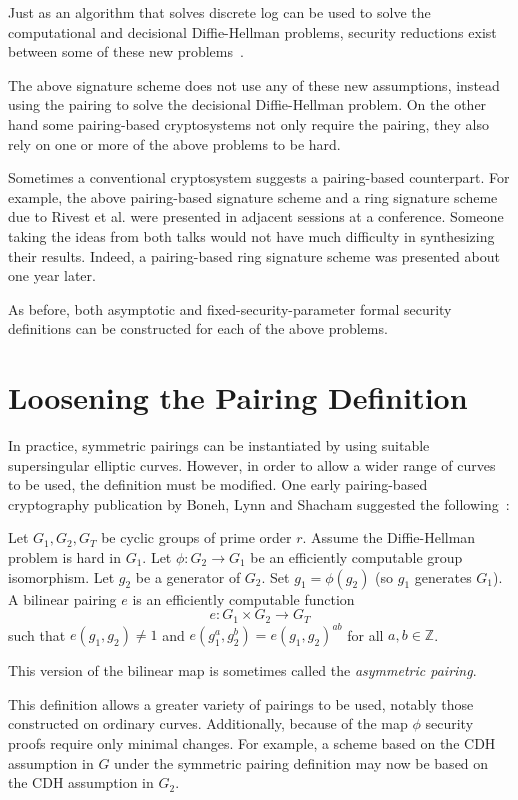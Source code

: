 Just as an algorithm that solves discrete log can be used to solve
the computational and decisional Diffie-Hellman problems, security reductions
exist between some of these new problems~\cite{jouxsurvey}.

The above signature scheme does not use any of these new assumptions,
instead using the pairing to solve the decisional Diffie-Hellman problem.
On the other hand some pairing-based cryptosystems not only require the
pairing, they also rely on one or more of the above problems to be hard.

Sometimes a conventional cryptosystem suggests
a pairing-based counterpart. For example,
the above pairing-based signature scheme and a ring signature scheme
due to Rivest et al. \cite{rst} were presented in adjacent sessions
at a conference. Someone taking the ideas from both talks would not have much
difficulty in synthesizing their results. Indeed,
a pairing-based ring signature scheme was presented about one
year later\cite{bgls}.

As before, both asymptotic and fixed-security-parameter formal security
definitions can be constructed for each of the above problems.

\section{\label{sec:asymmetricpairing}Loosening the Pairing Definition}

In practice, symmetric pairings can be instantiated by
using suitable supersingular elliptic curves.
However, in order to allow a wider range of curves to be used,
the definition must be modified. One early pairing-based cryptography
publication by Boneh, Lynn and Shacham
suggested the following~\cite{bls}:

Let $G_1, G_2, G_T$ be cyclic groups of prime order $r$.
Assume the Diffie-Hellman problem is hard in $G_1$.
Let $\phi : G_2 \rightarrow G_1$ be an efficiently computable group
isomorphism. Let $g_2$ be a generator of $G_2$.
Set $g_1 = \phi(g_2)$ (so $g_1$ generates $G_1$). 
A bilinear pairing $e$ is an efficiently computable function
\[
e:G_1 \times G_2 \rightarrow G_T
\]
such that $e(g_1,g_2) \ne 1$ and
$e(g_1^a, g_2^b) = e(g_1,g_2)^{a b}$ for all $a, b \in \mathbb{Z}$.

This version of the bilinear map is sometimes called
the \emph{asymmetric pairing}.

This definition allows a greater variety of pairings to be used,
notably those constructed on ordinary curves.
Additionally, because of the map $\phi$ security proofs
require only minimal changes. For example,
a scheme based on the CDH assumption in $G$ under
the symmetric pairing definition may now be based on the CDH assumption in
$G_2$.

